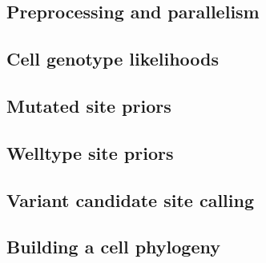 \documentclass[../main.tex]{subfiles}
\begin{document}


\subsection{Preprocessing and parallelism}


\subsection{Cell genotype likelihoods}


\subsection{Mutated site priors}


\subsection{Welltype site priors}


\subsection{Variant candidate site calling}


\subsection{Building a cell phylogeny}


\end{document}
